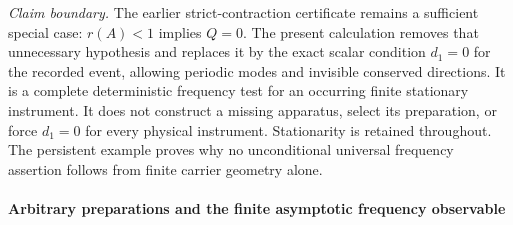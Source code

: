 \documentclass[12pt,a4paper]{article}
\begin{document}
\noindent\textit{Claim boundary.}
The earlier strict-contraction certificate remains a sufficient special
case: $r(A)<1$ implies $Q=0$. The present calculation removes that
unnecessary hypothesis and replaces it by the exact scalar condition
$d_1=0$ for the recorded event, allowing periodic modes and invisible
conserved directions. It is a complete deterministic frequency test for
an occurring finite stationary instrument. It does not construct a
missing apparatus, select its preparation, or force $d_1=0$ for every
physical instrument. Stationarity is retained throughout. The
persistent example proves why no unconditional universal frequency
assertion follows from finite carrier geometry alone.


\paragraph{Arbitrary preparations and the finite asymptotic frequency observable}
\end{document}
